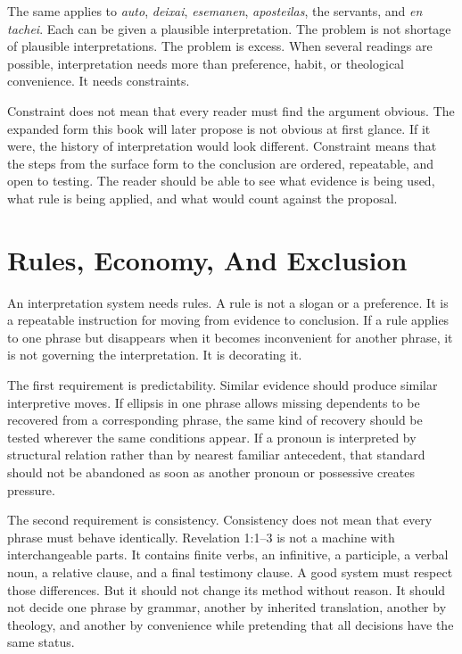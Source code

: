 The same applies to \textit{auto}, \textit{deixai}, \textit{esemanen}, \textit{aposteilas}, the servants, and \textit{en tachei}. Each can be given a plausible interpretation. The problem is not shortage of plausible interpretations. The problem is excess. When several readings are possible, interpretation needs more than preference, habit, or theological convenience. It needs constraints.

Constraint does not mean that every reader must find the argument obvious. The expanded form this book will later propose is not obvious at first glance. If it were, the history of interpretation would look different. Constraint means that the steps from the surface form to the conclusion are ordered, repeatable, and open to testing. The reader should be able to see what evidence is being used, what rule is being applied, and what would count against the proposal.

\section{Rules, Economy, And Exclusion}

An interpretation system needs rules. A rule is not a slogan or a preference. It is a repeatable instruction for moving from evidence to conclusion. If a rule applies to one phrase but disappears when it becomes inconvenient for another phrase, it is not governing the interpretation. It is decorating it.

The first requirement is predictability. Similar evidence should produce similar interpretive moves. If ellipsis in one phrase allows missing dependents to be recovered from a corresponding phrase, the same kind of recovery should be tested wherever the same conditions appear. If a pronoun is interpreted by structural relation rather than by nearest familiar antecedent, that standard should not be abandoned as soon as another pronoun or possessive creates pressure.

The second requirement is consistency. Consistency does not mean that every phrase must behave identically. Revelation 1:1--3 is not a machine with interchangeable parts. It contains finite verbs, an infinitive, a participle, a verbal noun, a relative clause, and a final testimony clause. A good system must respect those differences. But it should not change its method without reason. It should not decide one phrase by grammar, another by inherited translation, another by theology, and another by convenience while pretending that all decisions have the same status.

